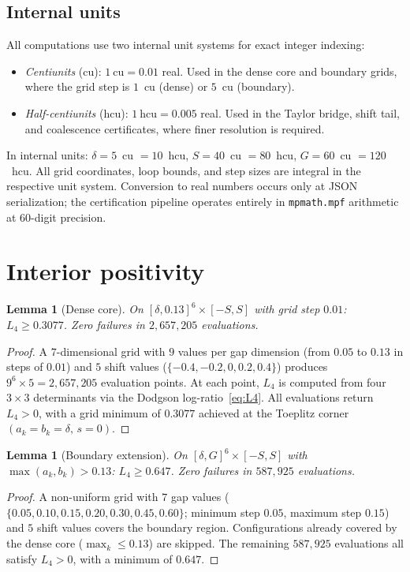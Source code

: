 \documentclass[11pt,a4paper]{amsart}
\newtheorem{lemma}[theorem]{Lemma}
\theoremstyle{definition}
\theoremstyle{remark}
\begin{document}
\subsection{Internal units}

All computations use two internal unit systems for exact integer
indexing:
\begin{itemize}[nosep]
  \item \emph{Centiunits} (cu): $1~\text{cu} = 0.01$ real.
        Used in the dense core and boundary grids,
        where the grid step is $1$~cu (dense) or $5$~cu (boundary).
  \item \emph{Half-centiunits} (hcu): $1~\text{hcu} = 0.005$ real.
        Used in the Taylor bridge, shift tail, and coalescence
        certificates, where finer resolution is required.
\end{itemize}
In internal units:
$\delta = 5$~cu $= 10$~hcu, $S = 40$~cu $= 80$~hcu,
$G = 60$~cu $= 120$~hcu.
All grid coordinates, loop bounds, and step sizes are integral
in the respective unit system.
Conversion to real numbers occurs only at JSON serialization;
the certification pipeline operates entirely in
\texttt{mpmath.mpf} arithmetic at $60$-digit precision.


\section{Interior positivity}\label{sec:interior}

\begin{lemma}[Dense core]\label{lem:dense}
On $[\delta, 0.13]^6 \times [-S, S]$ with grid step $0.01$:
$L_4 \ge 0.3077$. Zero failures in $2{,}657{,}205$ evaluations.
\end{lemma}
\begin{proof}
A $7$-dimensional grid with $9$ values per gap dimension
(from $0.05$ to $0.13$ in steps of $0.01$) and
$5$ shift values ($\{-0.4, -0.2, 0, 0.2, 0.4\}$)
produces $9^6 \times 5 = 2{,}657{,}205$ evaluation points.
At each point, $L_4$ is computed from four $3\times 3$ determinants
via the Dodgson log-ratio~\eqref{eq:L4}.
All evaluations return $L_4 > 0$, with a grid minimum of $0.3077$
achieved at the Toeplitz corner
$(a_k = b_k = \delta,\, s = 0)$.
\end{proof}

\begin{lemma}[Boundary extension]\label{lem:boundary}
On $[\delta, G]^6 \times [-S, S]$ with $\max(a_k, b_k) > 0.13$:
$L_4 \ge 0.647$. Zero failures in $587{,}925$ evaluations.
\end{lemma}
\begin{proof}
A non-uniform grid with $7$ gap values
($\{0.05, 0.10, 0.15, 0.20, 0.30, 0.45, 0.60\}$;
minimum step $0.05$, maximum step $0.15$)
and $5$ shift values covers the boundary region.
Configurations already covered by the dense core
($\max_k \le 0.13$) are skipped.
The remaining $587{,}925$ evaluations all satisfy $L_4 > 0$,
with a minimum of $0.647$.
\end{proof}
\end{document}
